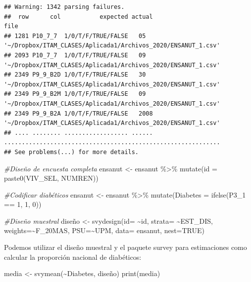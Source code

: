 \documentclass[
]{book}
\newenvironment{Shaded}{\begin{snugshade}}{\end{snugshade}}
\newcommand{\AttributeTok}[1]{\textcolor[rgb]{0.77,0.63,0.00}{#1}}
\newcommand{\CommentTok}[1]{\textcolor[rgb]{0.56,0.35,0.01}{\textit{#1}}}
\newcommand{\ConstantTok}[1]{\textcolor[rgb]{0.00,0.00,0.00}{#1}}
\newcommand{\DecValTok}[1]{\textcolor[rgb]{0.00,0.00,0.81}{#1}}
\newcommand{\FunctionTok}[1]{\textcolor[rgb]{0.00,0.00,0.00}{#1}}
\newcommand{\NormalTok}[1]{#1}
\newcommand{\OtherTok}[1]{\textcolor[rgb]{0.56,0.35,0.01}{#1}}
\newcommand{\SpecialCharTok}[1]{\textcolor[rgb]{0.00,0.00,0.00}{#1}}
\begin{document}
\begin{verbatim}
## Warning: 1342 parsing failures.
##  row      col           expected actual                                                          file
## 1281 P10_7_7  1/0/T/F/TRUE/FALSE   05   '~/Dropbox/ITAM_CLASES/Aplicada1/Archivos_2020/ENSANUT_1.csv'
## 2093 P10_7_7  1/0/T/F/TRUE/FALSE   09   '~/Dropbox/ITAM_CLASES/Aplicada1/Archivos_2020/ENSANUT_1.csv'
## 2349 P9_9_B2D 1/0/T/F/TRUE/FALSE   30   '~/Dropbox/ITAM_CLASES/Aplicada1/Archivos_2020/ENSANUT_1.csv'
## 2349 P9_9_B2M 1/0/T/F/TRUE/FALSE   09   '~/Dropbox/ITAM_CLASES/Aplicada1/Archivos_2020/ENSANUT_1.csv'
## 2349 P9_9_B2A 1/0/T/F/TRUE/FALSE   2008 '~/Dropbox/ITAM_CLASES/Aplicada1/Archivos_2020/ENSANUT_1.csv'
## .... ........ .................. ...... .............................................................
## See problems(...) for more details.
\end{verbatim}

\begin{Shaded}
\begin{Highlighting}[]
\CommentTok{\#Diseño de encuesta completa}
\NormalTok{ensanut }\OtherTok{\textless{}{-}}\NormalTok{ ensanut }\SpecialCharTok{\%\textgreater{}\%} \FunctionTok{mutate}\NormalTok{(}\AttributeTok{id =} \FunctionTok{paste0}\NormalTok{(VIV\_SEL, NUMREN))}

\CommentTok{\#Codificar diabéticos}
\NormalTok{ensanut }\OtherTok{\textless{}{-}}\NormalTok{ ensanut }\SpecialCharTok{\%\textgreater{}\%} \FunctionTok{mutate}\NormalTok{(}\AttributeTok{Diabetes =} \FunctionTok{ifelse}\NormalTok{(P3\_1 }\SpecialCharTok{==} \DecValTok{1}\NormalTok{, }\DecValTok{1}\NormalTok{, }\DecValTok{0}\NormalTok{))}

\CommentTok{\#Diseño muestral}
\NormalTok{diseño  }\OtherTok{\textless{}{-}} \FunctionTok{svydesign}\NormalTok{(}\AttributeTok{id=} \SpecialCharTok{\textasciitilde{}}\NormalTok{id, }\AttributeTok{strata=} \SpecialCharTok{\textasciitilde{}}\NormalTok{EST\_DIS, }\AttributeTok{weights=}\SpecialCharTok{\textasciitilde{}}\NormalTok{F\_20MAS, }\AttributeTok{PSU=}\SpecialCharTok{\textasciitilde{}}\NormalTok{UPM, }\AttributeTok{data=}\NormalTok{ ensanut, }\AttributeTok{nest=}\ConstantTok{TRUE}\NormalTok{)}
\end{Highlighting}
\end{Shaded}

Podemos utilizar el diseño muestral y el paquete survey para estimaciones como calcular la proporción nacional de diabéticos:

\begin{Shaded}
\begin{Highlighting}[]
\NormalTok{media }\OtherTok{\textless{}{-}} \FunctionTok{svymean}\NormalTok{(}\SpecialCharTok{\textasciitilde{}}\NormalTok{Diabetes, diseño)}
\FunctionTok{print}\NormalTok{(media)}
\end{Highlighting}
\end{Shaded}
\end{document}
